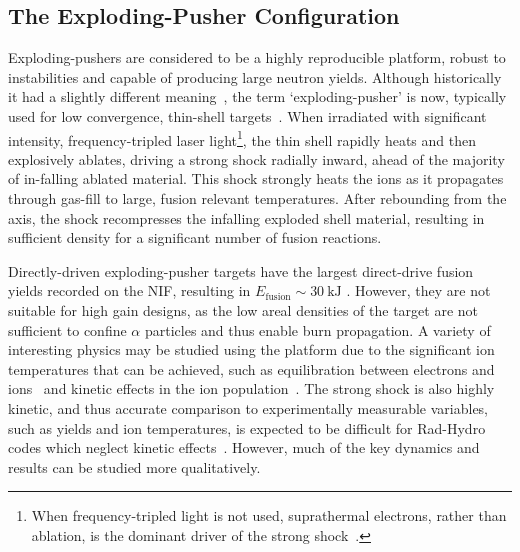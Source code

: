 \subsection{The Exploding-Pusher Configuration}%
\label{sec:Res2_expl}

Exploding-pushers are considered to be a highly reproducible platform, robust to instabilities and capable of producing large neutron yields.
Although historically it had a slightly different meaning~\cite{craxton_direct-drive_2015}, the term `exploding-pusher' is now, typically used for low convergence, thin-shell targets~\cite{ellison_development_2018}.
When irradiated with significant intensity, frequency-tripled laser light\footnote{When frequency-tripled light is not used, suprathermal electrons, rather than ablation, is the dominant driver of the strong shock~\cite{yeamans_high_2021}.}, the thin shell rapidly heats and then explosively ablates, driving a strong shock radially inward, ahead of the majority of in-falling ablated material.
This shock strongly heats the ions as it propagates through gas-fill to large, fusion relevant temperatures.
After rebounding from the axis, the shock recompresses the infalling exploded shell material, resulting in sufficient density for a significant number of fusion reactions.

Directly-driven exploding-pusher targets have the largest direct-drive fusion yields recorded on the \ac{NIF}, resulting in $E_{\text{fusion}}\sim 30\ \text{kJ}$ \cite{yeamans_high_2021}.
However, they are not suitable for high gain designs, as the low areal densities of the target are not sufficient to confine $\alpha$ particles and thus enable burn propagation.
A variety of interesting physics may be studied using the platform due to the significant ion temperatures that can be achieved, such as equilibration between electrons and ions~\cite{benedict_molecular_2012} and kinetic effects in the ion population~\cite{mannion_evidence_2023}.
The strong shock is also highly kinetic, and thus accurate comparison to experimentally measurable variables, such as yields and ion temperatures, is expected to be difficult for \ac{Rad-Hydro} codes which neglect kinetic effects~\cite{larroche_ion-kinetic_2016}.
However, much of the key dynamics and results can be studied more qualitatively.

